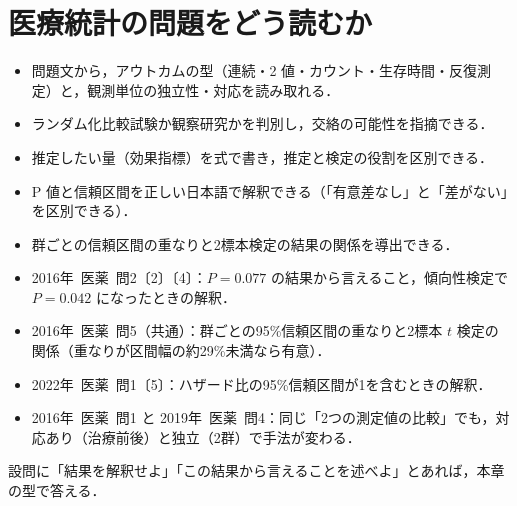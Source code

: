 \documentclass[a4paper,11pt,openany]{ltjsbook}
\newcommand{\kakomon}[2]{\mbox{#1年 医薬 問#2}}
\begin{document}
\tableofcontents

\mainmatter
{}

\chapter{医療統計の問題をどう読むか}\label{ch:01}

\begin{goalbox}
\begin{itemize}
\item 問題文から，アウトカムの型（連続・2 値・カウント・生存時間・反復測定）と，観測単位の独立性・対応を読み取れる．
\item ランダム化比較試験か観察研究かを判別し，交絡の可能性を指摘できる．
\item 推定したい量（効果指標）を式で書き，推定と検定の役割を区別できる．
\item P 値と信頼区間を正しい日本語で解釈できる（「有意差なし」と「差がない」を区別できる）．
\item 群ごとの信頼区間の重なりと2標本検定の結果の関係を導出できる．
\end{itemize}
\end{goalbox}

\begin{exambox}
\begin{itemize}
\item \kakomon{2016}{2}〔2〕〔4〕：$P=0.077$ の結果から言えること，傾向性検定で $P=0.042$ になったときの解釈．
\item \kakomon{2016}{5}（共通）：群ごとの95\%信頼区間の重なりと2標本 $t$ 検定の関係（重なりが区間幅の約29\%未満なら有意）．
\item \kakomon{2022}{1}〔5〕：ハザード比の95\%信頼区間が1を含むときの解釈．
\item \kakomon{2016}{1} と \kakomon{2019}{4}：同じ「2つの測定値の比較」でも，対応あり（治療前後）と独立（2群）で手法が変わる．
\end{itemize}
設問に「結果を解釈せよ」「この結果から言えることを述べよ」とあれば，本章の型で答える．
\end{exambox}
\end{document}
